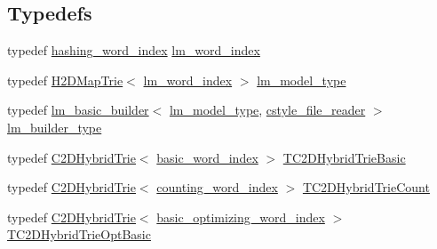 \subsection*{Typedefs}
\begin{DoxyCompactItemize}
\item 
typedef \hyperlink{classuva_1_1smt_1_1bpbd_1_1server_1_1lm_1_1dictionary_1_1hashing__word__index}{hashing\+\_\+word\+\_\+index} \hyperlink{namespaceuva_1_1smt_1_1bpbd_1_1server_1_1lm_a023e38a6fe02511f8c3c806784c2a5f2}{lm\+\_\+word\+\_\+index}
\item 
typedef \hyperlink{classuva_1_1smt_1_1bpbd_1_1server_1_1lm_1_1_h2_d_map_trie}{H2\+D\+Map\+Trie}$<$ \hyperlink{namespaceuva_1_1smt_1_1bpbd_1_1server_1_1lm_a023e38a6fe02511f8c3c806784c2a5f2}{lm\+\_\+word\+\_\+index} $>$ \hyperlink{namespaceuva_1_1smt_1_1bpbd_1_1server_1_1lm_a1d312807a76856e10bfbed1cae210b0d}{lm\+\_\+model\+\_\+type}
\item 
typedef \hyperlink{classuva_1_1smt_1_1bpbd_1_1server_1_1lm_1_1arpa_1_1lm__basic__builder}{lm\+\_\+basic\+\_\+builder}$<$ \hyperlink{namespaceuva_1_1smt_1_1bpbd_1_1server_1_1lm_a1d312807a76856e10bfbed1cae210b0d}{lm\+\_\+model\+\_\+type}, \hyperlink{classuva_1_1utils_1_1file_1_1cstyle__file__reader}{cstyle\+\_\+file\+\_\+reader} $>$ \hyperlink{namespaceuva_1_1smt_1_1bpbd_1_1server_1_1lm_aef3a083c436191e635148561bb2192c6}{lm\+\_\+builder\+\_\+type}
\item 
typedef \hyperlink{classuva_1_1smt_1_1bpbd_1_1server_1_1lm_1_1_c2_d_hybrid_trie}{C2\+D\+Hybrid\+Trie}$<$ \hyperlink{classuva_1_1smt_1_1bpbd_1_1server_1_1lm_1_1dictionary_1_1basic__word__index}{basic\+\_\+word\+\_\+index} $>$ \hyperlink{namespaceuva_1_1smt_1_1bpbd_1_1server_1_1lm_a96890f7df15f6df7def061b4cebb16bb}{T\+C2\+D\+Hybrid\+Trie\+Basic}
\item 
typedef \hyperlink{classuva_1_1smt_1_1bpbd_1_1server_1_1lm_1_1_c2_d_hybrid_trie}{C2\+D\+Hybrid\+Trie}$<$ \hyperlink{classuva_1_1smt_1_1bpbd_1_1server_1_1lm_1_1dictionary_1_1counting__word__index}{counting\+\_\+word\+\_\+index} $>$ \hyperlink{namespaceuva_1_1smt_1_1bpbd_1_1server_1_1lm_a8e12ef7ca924b2c5fd7f20236fe08dc5}{T\+C2\+D\+Hybrid\+Trie\+Count}
\item 
typedef \hyperlink{classuva_1_1smt_1_1bpbd_1_1server_1_1lm_1_1_c2_d_hybrid_trie}{C2\+D\+Hybrid\+Trie}$<$ \hyperlink{namespaceuva_1_1smt_1_1bpbd_1_1server_1_1lm_1_1dictionary_a3001583c904eec702b4a4125082a7ecd}{basic\+\_\+optimizing\+\_\+word\+\_\+index} $>$ \hyperlink{namespaceuva_1_1smt_1_1bpbd_1_1server_1_1lm_a3f81cdde0dc5ee7b07e41261e55d72de}{T\+C2\+D\+Hybrid\+Trie\+Opt\+Basic}

\end{DoxyCompactItemize}
